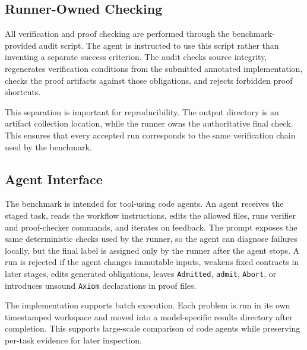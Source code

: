 \subsection{Runner-Owned Checking}

All verification and proof checking are performed through the benchmark-provided audit script. The agent is instructed to use this script rather than inventing a separate success criterion. The audit checks source integrity, regenerates verification conditions from the submitted annotated implementation, checks the proof artifacts against those obligations, and rejects forbidden proof shortcuts.

This separation is important for reproducibility. The output directory is an artifact collection location, while the runner owns the authoritative final check. This ensures that every accepted run corresponds to the same verification chain used by the benchmark.

\subsection{Agent Interface}

The benchmark is intended for tool-using code agents. An agent receives the staged task, reads the workflow instructions, edits the allowed files, runs verifier and proof-checker commands, and iterates on feedback. The prompt exposes the same deterministic checks used by the runner, so the agent can diagnose failures locally, but the final label is assigned only by the runner after the agent stops. A run is rejected if the agent changes immutable inputs, weakens fixed contracts in later stages, edits generated obligations, leaves \texttt{Admitted}, \texttt{admit}, \texttt{Abort}, or introduces unsound \texttt{Axiom} declarations in proof files.

The implementation supports batch execution. Each problem is run in its own timestamped workspace and moved into a model-specific results directory after completion. This supports large-scale comparison of code agents while preserving per-task evidence for later inspection.

